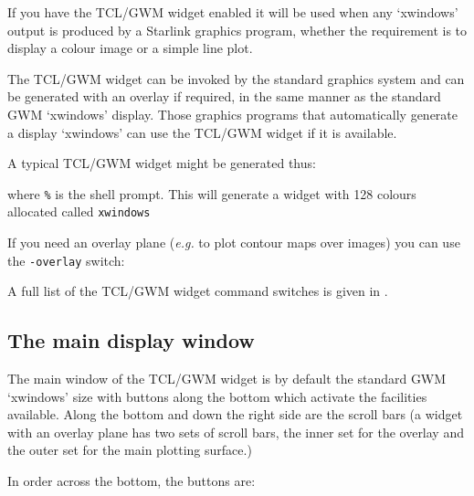 \documentclass[twoside,11pt,nolof]{starlink}
\begin{document}
If you have the TCL/GWM widget enabled it will be used when any `xwindows'
output is produced by a Starlink graphics program, whether the requirement
is to display a colour image or a simple line plot.

The TCL/GWM widget can be invoked by the standard graphics system and can
be generated with an overlay if required, in the same manner as the
standard GWM `xwindows' display.  Those graphics programs that automatically
generate a display `xwindows' can use the TCL/GWM widget if it is available.

A typical TCL/GWM widget might be generated thus:

\begin{terminalv}
\end{terminalv}

where \texttt{\%} is the shell prompt.  This will generate a widget with
128 colours allocated called {\texttt{xwindows}}

If you need an overlay plane ({\emph{e.g.}}\/ to plot contour maps over images)
you can use the {\texttt{-overlay}} switch:

\begin{terminalv}
\end{terminalv}

A full list of the TCL/GWM widget command switches is given in
.

\subsection{\label{the_main_display_window}The  main display window}

The main window of the TCL/GWM widget is by default the standard GWM
`xwindows' size with buttons along the bottom which activate the
facilities available.  Along the bottom and down the right side are the
scroll bars (a widget with an overlay plane has two sets of scroll
bars, the inner set for the overlay and the outer set for the main
plotting surface.)

In order across the bottom, the buttons are:
\end{document}
